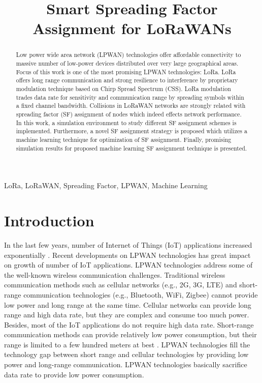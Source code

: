 \documentclass[conference]{IEEEtran}
\begin{document}
\title{Smart Spreading Factor Assignment for LoRaWANs}


\author{
}
\maketitle


\begin{abstract}
Low power wide area network (LPWAN) technologies offer affordable connectivity to massive number of low-power devices distributed over very large geographical areas. Focus of this work is one of the most promising LPWAN technologies: LoRa. LoRa offers long range communication and strong resilience to interference by proprietary modulation technique based on Chirp Spread Spectrum (CSS). LoRa modulation trades data rate for sensitivity and communication range by spreading symbols within a fixed channel bandwidth. Collisions in LoRaWAN networks are strongly related with spreading factor (SF) assignment of nodes which indeed effects network performance. In this work, a simulation environment to study different SF assignment schemes is implemented. Furthermore, a novel SF assignment strategy is proposed which utilizes a machine learning technique for optimization of SF assignment. Finally, promising simulation results for proposed machine learning SF assignment technique is presented.
\end{abstract}


\begin{IEEEkeywords}
LoRa, LoRaWAN, Spreading Factor, LPWAN, Machine Learning
\end{IEEEkeywords}


\section{Introduction}
\par In the last few years, number of Internet of Things (IoT) applications increased exponentially \cite{7721743}. Recent developments on LPWAN technologies has great impact on growth of number of IoT applications. LPWAN technologies address some of the well-known wireless communication challenges. Traditional wireless communication methods such as cellular networks (e.g., 2G, 3G, LTE) and short-range communication technologies (e.g., Bluetooth, WiFi, Zigbee) cannot provide low power and long range at the same time. Cellular networks can provide long range and high data rate, but they are complex and consume too much power. Besides, most of the IoT applications do not require high data rate. Short-range communication methods can provide relatively low power consumption, but their range is limited to a few hundred meters at best \cite{7815384}. LPWAN technologies fill the technology gap between short range and cellular technologies by providing low power and long-range communication. LPWAN technologies basically sacrifice data rate to provide low power consumption.
\end{document}
